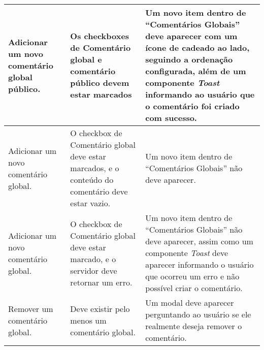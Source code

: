 \begin{quadro}[H]
\begin{tabular}{|p{5.0cm}|p{5.0cm}|p{4.5cm}|}
	\hline
	Adicionar um novo comentário global público. & Os checkboxes de Comentário global e comentário público devem estar marcados & Um novo item dentro de ``Comentários Globais'' deve aparecer com um ícone de cadeado ao lado, seguindo a ordenação configurada, além de um componente \textit{Toast} informando ao usuário que o comentário foi criado com sucesso. \\ 
	\hline
	Adicionar um novo comentário global. & O checkbox de Comentário global deve estar marcados, e o conteúdo do comentário deve estar vazio. & Um novo item dentro de ``Comentários Globais'' não deve aparecer. \\
	\hline
	Adicionar um novo comentário global. & O checkbox de Comentário global deve estar marcado, e o servidor deve retornar um erro. & Um novo item dentro de ``Comentários Globais'' não deve aparecer, assim como um componente \textit{Toast} deve aparecer informando o usuário que ocorreu um erro e não possível criar o comentário. \\ 
	\hline 
	Remover um comentário global. & Deve existir pelo menos um comentário global. & Um modal deve aparecer perguntando ao usuário se ele realmente deseja remover o comentário. \\ 
	\hline
\end{tabular}
\end{quadro}

